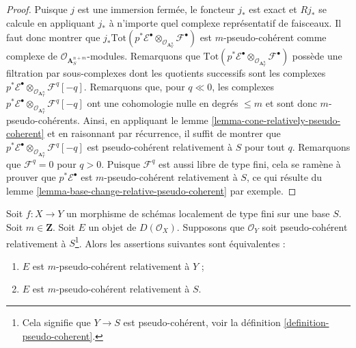 \begin{proof}
\medskip\noindent
Puisque $j$ est une immersion fermée, le foncteur $j_*$ est exact et
$Rj_*$ se calcule en appliquant $j_*$ à n'importe quel complexe représentatif
de faisceaux. Il faut donc montrer que
$j_*\text{Tot}(p^*\mathcal{E}^\bullet \otimes_{\mathcal{O}_{\mathbf{A}_Y^n}}
\mathcal{F}^\bullet)$ est $m$-pseudo-cohérent
comme complexe de $\mathcal{O}_{\mathbf{A}^{n + m}_S}$-modules.
Remarquons que
$\text{Tot}(p^*\mathcal{E}^\bullet \otimes_{\mathcal{O}_{\mathbf{A}_Y^n}}
\mathcal{F}^\bullet)$ possède une filtration par
sous-complexes dont les quotients successifs sont les complexes
$p^*\mathcal{E}^\bullet
\otimes_{\mathcal{O}_{\mathbf{A}_Y^n}} \mathcal{F}^q[-q]$.
Remarquons que, pour $q \ll 0$, les complexes
$p^*\mathcal{E}^\bullet \otimes_{\mathcal{O}_{\mathbf{A}_Y^n}}
\mathcal{F}^q[-q]$
ont une cohomologie nulle en degrés $\leq m$ et sont donc $m$-pseudo-cohérents.
Ainsi, en appliquant le
lemme \ref{lemma-cone-relatively-pseudo-coherent}
et en raisonnant par récurrence, il suffit de montrer que
$p^*\mathcal{E}^\bullet \otimes_{\mathcal{O}_{\mathbf{A}_Y^n}}
\mathcal{F}^q[-q]$
est pseudo-cohérent relativement à $S$ pour tout $q$. Remarquons que $\mathcal{F}^q = 0$
pour $q > 0$. Puisque $\mathcal{F}^q$ est aussi libre de type fini, cela
se ramène à prouver que $p^*\mathcal{E}^\bullet$ est
$m$-pseudo-cohérent relativement à $S$, ce qui résulte du
lemme \ref{lemma-base-change-relative-pseudo-coherent}
par exemple.
\end{proof}

\begin{lemma}
\label{lemma-composition-relative-pseudo-coherent}
Soit $f : X \to Y$ un morphisme de schémas localement de type fini
sur une base $S$. Soit $m \in \mathbf{Z}$. Soit $E$ un objet de
$D(\mathcal{O}_X)$. Supposons que $\mathcal{O}_Y$ soit pseudo-cohérent relativement
à $S$\footnote{Cela signifie que $Y \to S$ est pseudo-cohérent, voir la
définition \ref{definition-pseudo-coherent}.}.
Alors les assertions suivantes sont équivalentes :
\begin{enumerate}
\item $E$ est $m$-pseudo-cohérent relativement à $Y$ ;
\item $E$ est $m$-pseudo-cohérent relativement à $S$.
\end{enumerate}
\end{lemma}


